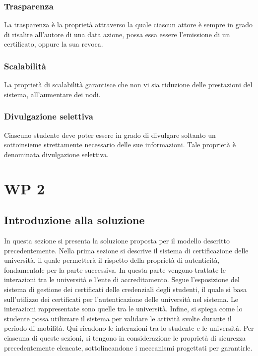 \documentclass[a4paper,12pt]{article}
\begin{document}
\subsubsection{Trasparenza}
La trasparenza è la proprietà attraverso la quale ciascun attore è sempre in grado di risalire all'autore di una data azione, possa essa essere l'emissione di un certificato, oppure la sua revoca.
\subsubsection{Scalabilità}
La proprietà di scalabilità garantisce che non vi sia riduzione delle prestazioni del sistema, all'aumentare dei nodi.
\subsubsection{Divulgazione selettiva}
Ciascuno studente deve poter essere in grado di divulgare soltanto un sottoinsieme strettamente necessario delle sue informazioni. Tale proprietà è denominata divulgazione selettiva.



\newpage
\section{WP 2}
\subsection{Introduzione alla soluzione}
In questa sezione si presenta la soluzione proposta per il modello descritto precedentemente.
\newline Nella prima sezione si descrive il sistema di certificazione delle università, il quale permetterà il rispetto della proprietà di autenticità, fondamentale per la parte successiva. In questa parte vengono trattate le interazioni tra le università e l'ente di accreditamento.  
\newline Segue l'esposizione del sistema di gestione dei certificati delle credenziali degli studenti, il quale si basa sull'utilizzo dei certificati per l'autenticazione delle università nel sistema. Le interazioni rappresentate sono quelle tra le università. 
\newline Infine, si spiega come lo studente possa utilizzare il sistema per validare le attività svolte durante il periodo di mobilità. Qui ricadono le interazioni tra lo studente e le università. 
\newline Per ciascuna di queste sezioni, si tengono in considerazione le proprietà di sicurezza precedentemente elencate, sottolineandone i meccanismi progettati per garantirle.
\end{document}
